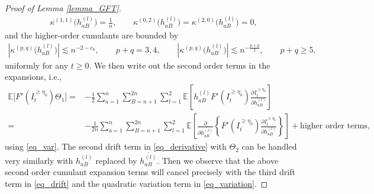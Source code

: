 \documentclass[10pt,reqno]{amsart}
\newcommand{\II}{I^{\geq \eta_0}} %
\newcommand{\dd}{\mathrm{d}}
\newcommand{\ii}{\mathrm{i}}
\newcommand{\ie}{i.e., }
\newcommand{\<}{\langle}
\renewcommand{\>}{\rangle}
\numberwithin{equation}{section}
\begin{document}
\begin{proof}[Proof of Lemma \ref{lemma_GFT}]
\begin{align}\label{eq_var}
	\kappa^{(1,1)}\big(h^{(l)}_{aB}\big)=\frac{1}{n}, \qquad \kappa^{(0,2)}\big(h^{(l)}_{aB}\big)=\kappa^{(2,0)}\big(h^{(l)}_{aB}\big)=0, 
\end{align}
and the higher-order cumulants are bounded by
\begin{align}\label{eq_cumu_bound}
	|\kappa^{(p,q)}\big(h^{(l)}_{aB}\big)| \lesssim  n^{-2-c_0},\qquad p+q=3,4, \qquad |\kappa^{(p,q)}\big(h^{(l)}_{aB}\big)| \lesssim  n^{-\frac{p+q}{2}}, \qquad p+q\geq 5,
\end{align}
uniformly for any $t\geq 0$. 
We then write out the second order terms in the expansions, \ie
\begin{align}
\mathbb{E} \big[ F'(\II_t) \Theta_1 \big]=&-\frac{1}{2}\sum_{a=1}^n \sum_{B=n+1}^{2n} \sum_{l=1}^2  \mathbb{E} \left[ h^{(l)}_{aB}  F'(\II_t) \frac{  \partial \II_t}{\partial h^{(l)}_{aB}}  \right]\nonumber\\
=&-\frac{1}{2n}\sum_{a=1}^n \sum_{B=n+1}^{2n} \sum_{l=1}^2  \mathbb{E} \left[ \frac{\partial}{\partial \overline{h^{(l)}_{aB}}} \left\{ F'(\II_t) \frac{  \partial \II_t}{\partial h^{(l)}_{aB}} \right\}  \right]
+\mbox{higher order terms}\label{second_order},
\end{align}
 using \eqref{eq_var}. The second drift term in \eqref{eq_derivative} with $\Theta_2$ can be handled very similarly with $h^{(l)}_{aB}$ replaced by $\overline{h^{(l)}_{aB}}$. Then we observe that the above second order cumulant expansion terms will cancel precisely with the third drift term in \eqref{eq_drift} and the quadratic variation term  in \eqref{eq_variation}.

\end{proof}
\end{document}
